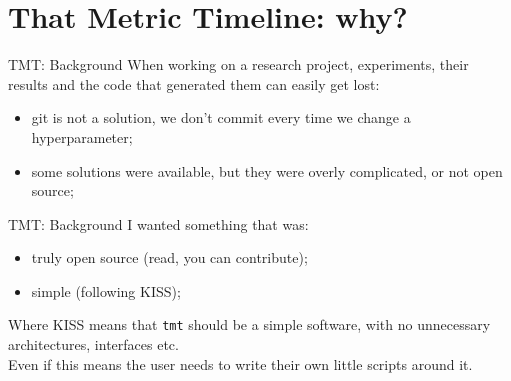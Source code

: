 \documentclass[aspectratio=169,xcolor={dvipsnames}]{beamer}
\begin{document}
  \section{That Metric Timeline: why?}
  \begin{frame}{TMT: Background}
    When working on a research project, experiments, their results
    and the code that generated them can easily get lost:
    \begin{itemize}
      \item git is not a solution, we don't commit every time we change a hyperparameter;
      \item some solutions were available, but they were overly complicated, or not open source;
    \end{itemize}
  \end{frame}
  \begin{frame}{TMT: Background}
    I wanted something that was:
    \begin{itemize}
      \item truly open source (read, you can contribute);
      \item simple (following KISS);
    \end{itemize}
    Where KISS means that \texttt{tmt} should be a simple software, with no unnecessary architectures,
    interfaces etc.\\Even if this means the user needs to write their own little scripts around it.
  \end{frame}
\end{document}
